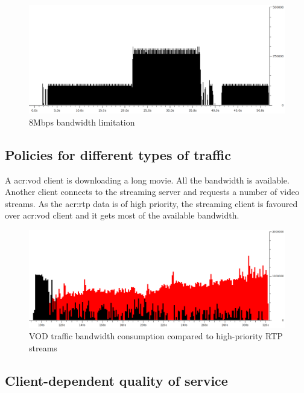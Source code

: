 \documentclass[11pt]{book}
\begin{document}
        \begin{figure}[H]
          \begin{center}
            \includegraphics[width=.7\textwidth]{img/test-case/limit.png}
          \end{center}

          \caption{8Mbps bandwidth limitation}
          \label{fig:uc:limit}
        \end{figure}


      \subsection{Policies for different types of traffic}
      \label{sub:uc:traffic}

        A \gls{acr:vod} client is downloading a long movie. All the bandwidth is available. Another client connects to the
        streaming server and requests a number of video streams. As the \gls{acr:rtp} data is of high priority, the streaming
        client is favoured over \gls{acr:vod} client and it gets most of the available bandwidth.

        \begin{figure}[H]
          \begin{center}
            \includegraphics[width=.7\textwidth]{img/test-case/vod-rtp.png}
          \end{center}

          \caption{VOD traffic bandwidth consumption compared to high-priority RTP streams}
        \end{figure}


      \subsection{Client-dependent quality of service}
      \label{sub:uc:client}
\end{document}
